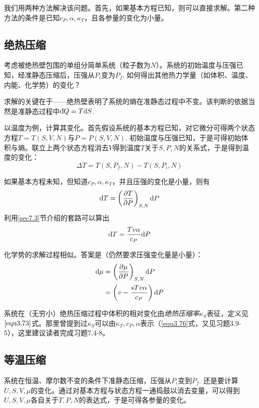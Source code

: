 我们用两种方法解决该问题。首先，如果基本方程已知，则可以直接求解。第二种方法的条件是已知$c_P, \alpha, \kappa_T$，且各参量的变化为小量。

\subsection*{绝热压缩}
考虑被绝热壁包围的单组分简单系统（粒子数为$N$）。系统的初始温度与压强已知，经准静态压缩后，压强从$P_i$变为$P_f$. 如何得出其他热力学量（如体积、温度、内能、化学势）的变化？

求解的关键在于——绝热壁表明了系统的熵在准静态过程中不变。该判断的依据当然是准静态过程中$\mathrm d\hspace*{-0.1em}\bar{}\hspace*{0.08em} Q = T \mathrm{d} S$.

以温度为例，计算其变化。首先假设系统的基本方程已知，对它微分可得两个状态方程$T = T(S, V, N)$与$P = P(S, V, N)$. 初始温度与压强已知，于是可得初始体积与熵。联立上两个状态方程消去$V$得到温度$T$关于$S, P, N$的关系式，于是得到温度的变化：
\begin{equation}
	\Delta T = T(S, P_f, N) - T(S, P_i, N)
\label{equ7.37}
\end{equation}

如果基本方程未知，但知道$c_P, \alpha, \kappa_T$，并且压强的变化是小量，则有
\begin{equation}
	\mathrm{d} T = \left( \frac{\partial T}{\partial P} \right)_{S, N} \mathrm{d} P 
\label{equ7.38}
\end{equation}
利用\ref{sec7.3}节介绍的套路可以算出
\begin{equation}
	\mathrm{d} T = \frac{Tv\alpha}{c_P} \mathrm{d} P 
\label{equ7.39}
\end{equation}

化学势的求解过程相似。答案是（仍然要求压强变化量是小量）：
\begin{align}
	\mathrm{d} \mu &= \left( \frac{\partial \mu}{\partial P} \right)_{S, N} \mathrm{d} P \label{equ7.40} \\
	&= \left( v - \frac{sTv\alpha}{c_P} \right) \mathrm{d} P \label{equ7.41}
\end{align}

系统在（无穷小）绝热压缩过程中体积的相对变化由{\it 绝热压缩率}$\kappa_S$表征，定义见$\eqref{equ3.73}$式。那里曾提到过$\kappa_S$可以由$\kappa_T, c_P, \alpha$表示（\eqref{equ3.76}式，又见习题3.9-5），这里建议读者完成习题7.4-8。

\subsection*{等温压缩}
系统在恒温、摩尔数不变的条件下准静态压缩，压强从$P_i$变到$P_f$. 还是要计算$U, S, V, \mu$的变化。通过对基本方程与状态方程一通捣鼓以消去变量，可以得到$U, S, V, \mu$各自关于$T, P, N$的表达式，于是可得各参量的变化。


